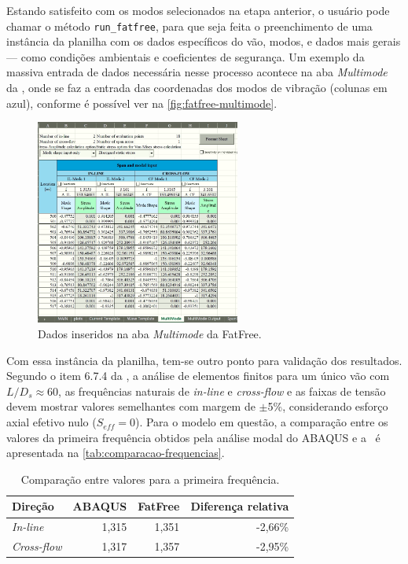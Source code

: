 Estando satisfeito com os modos selecionados na etapa anterior, o usuário pode chamar o método \texttt{run\_fatfree}, para que seja feita o preenchimento de uma instância da planilha com os dados específicos do vão, modos, e dados mais gerais --- como condições ambientais e coeficientes de segurança. Um exemplo da massiva entrada de dados necessária nesse processo acontece na aba \textit{Multimode} da \fatfree, onde se faz a entrada das coordenadas dos modos de vibração (colunas em azul), conforme é possível ver na \autoref{fig:fatfree-multimode}.

\begin{figure}[!ht]
	\centering
	\caption{Dados inseridos na aba \textit{Multimode} da FatFree.}\label{fig:fatfree-multimode}
	\includegraphics[width=0.6\textwidth]{imagens/exemplo/fatfree_multimode}
\end{figure}

Com essa instância da planilha, tem-se outro ponto para validação dos resultados.
Segundo o item 6.7.4 da , a análise de elementos finitos para um único vão com $L / D_s \approx 60$, as frequências naturais de \textit{in-line} e \textit{cross-flow} e as faixas de tensão devem mostrar valores semelhantes com margem de $\pm$5\%, considerando esforço axial efetivo nulo ($S_{eff} = 0$). Para o modelo em questão, a comparação entre os valores da primeira frequência obtidos pela análise modal do ABAQUS e a \fatfree\ é apresentada na \autoref{tab:comparacao-frequencias}.

\begin{table}[!ht]
\renewcommand{\arraystretch}{1.2}
\centering
\caption{Comparação entre valores para a primeira frequência.}\label{tab:comparacao-frequencias}
\begin{tabular}{lrrr}
\toprule
Direção & ABAQUS & FatFree & Diferença relativa\\
\midrule
\textit{In-line}    & 1,315 & 1,351 & -2,66\%\\ %
\textit{Cross-flow} & 1,317 & 1,357 & -2,95\%\\ %
\bottomrule
\end{tabular}
\end{table}

